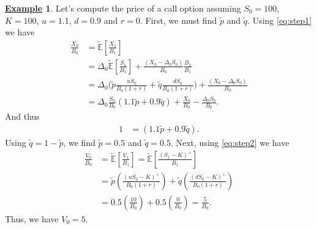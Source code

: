 \documentclass[12pt]{book}
\numberwithin{equation}{chapter}
\theoremstyle{plain}
\numberwithin{theorem}{section}
\theoremstyle{definition}
\newtheorem{example}[theorem]{\underline{Example}}
\numberwithin{exercise}{chapter}
\newcommand{\<}{\langle}
\renewcommand{\>}{\rangle}
\renewcommand{\(}{\left(}
\renewcommand{\)}{\right)}
\renewcommand{\[}{\left[}
\renewcommand{\]}{\right]}
\newcommand\Eb{\mathds{E}}
\newcommand\Del{\Delta}
\newcommand\Ebt{\widetilde{\Eb}}
\newcommand\qt{\widetilde{q}}
\theoremstyle{definition}
\numberwithin{question}{section}
\newcommand\pt{\widetilde{p}}
\begin{document}
\begin{example}
Let's compute the price of a call option assuming $S_0 = 100$, $K=100$, $u = 1.1$, $d=0.9$ and $r=0$.  First, we must find $\pt$ and $\qt$.  Using \eqref{eq:step1} we have
\begin{align}
\frac{X_0}{B_0}
	&=	\Ebt \[ \frac{X_1}{B_1} \] \\
	&=	\Del_0 \Ebt \[ \frac{S_1}{B_1} \] + \frac{(X_0-\Del_0 S_0)}{B_0}\frac{B_1}{B_1} \\
	&= \Del_0 \Big( \pt \frac{u S_0}{B_0 (1 + r) } + \qt \frac{d S_0}{B_0(1 + r)} \Big) + \frac{(X_0-\Del_0 S_0)}{B_0} \\
	&=	\Del_0  \frac{S_0}{B_0} (1.1 \pt + 0.9 \qt ) + \frac{X_0}{B_0} - \frac{\Del_0 S_0}{B_0}.
\end{align}  
And thus
\begin{align}
1
	&=	(1.1 \pt + 0.9 \qt )  .
\end{align}
Using $\qt = 1-\pt$, we find $\pt = 0.5$ and $\qt = 0.5$.  Next, using \eqref{eq:step2} we have
\begin{align}
\frac{V_0}{B_0}
	&=	\Ebt \[ \frac{V_1}{B_1} \] = \Ebt \[ \frac{(S_1-K)^+}{B_1} \] \\
	&= 	\pt \( \frac{(u S_0 -K)^+}{B_0 (1+r)} \) + \qt \( \frac{(d S_0-K)^+}{B_0 (1+r)} \) \\
	&=	0.5 \( \frac{10}{B_0} \) + 0.5 \( \frac{0}{B_0} \) = \frac{5}{B_0} .
\end{align}
Thus, we have $V_0 = 5$.
\end{example}
\end{document}

